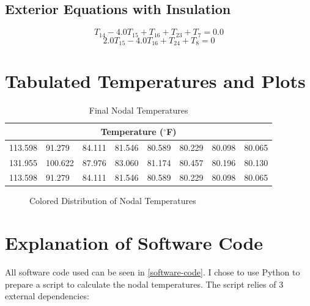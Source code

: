 \documentclass[12pt, stu, floatsintext, hidelinks]{apa7}
\begin{document}
\subsection{Exterior Equations with Insulation}

$$
	T_{14} - 4.0 T_{15} + T_{16} + T_{23} + T_{7} = 0.0
$$
$$
	2.0 T_{15} - 4.0 T_{16} + T_{24} + T_{8} = 0
$$

\section{Tabulated Temperatures and Plots}

\begin{table}[H]
	\centering
	\caption{Final Nodal Temperatures}
	\begin{threeparttable}
		\begin{tabular}{llllllll}
			\toprule
			\multicolumn{8}{c}{Temperature ($^\circ$F)}                             \\
			\midrule
			113.598 & 91.279  & 84.111 & 81.546 & 80.589 & 80.229 & 80.098 & 80.065 \\
			131.955 & 100.622 & 87.976 & 83.060 & 81.174 & 80.457 & 80.196 & 80.130 \\
			113.598 & 91.279  & 84.111 & 81.546 & 80.589 & 80.229 & 80.098 & 80.065 \\
			\bottomrule
		\end{tabular}
	\end{threeparttable}
\end{table}

\begin{figure}[H]
	\caption{Colored Distribution of Nodal Temperatures}
\end{figure}

\section{Explanation of Software Code}

All software code used can be seen in \autoref{software-code}. I chose to use Python to prepare a script to calculate the nodal temperatures. The script relies of 3 external dependencies:
\end{document}
